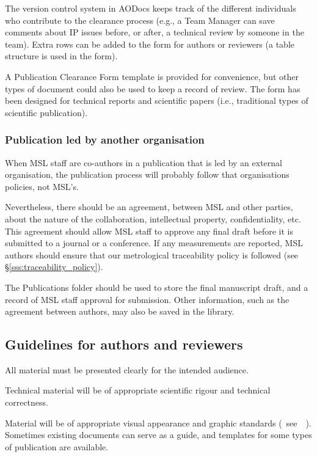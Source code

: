 The version control system in AODocs keeps track of the different individuals who contribute to the clearance process (e.g., a Team Manager can save comments about IP issues before, or after, a technical review by someone in the team). Extra rows can be added to the form for authors or reviewers (a table structure is used in the form).

A Publication Clearance Form template is provided for convenience, but other types of document could also be used to keep a record of review. The form has been designed for technical reports and scientific papers (i.e., traditional types of scientific publication).  

\subsubsection{Publication led by another organisation}

When MSL staff are co-authors in a publication that is led by an external organisation, the publication process will probably follow that organisations policies, not MSL's. 

Nevertheless, there should be an agreement, between MSL and other parties, about the nature of the collaboration, intellectual property, confidentiality, etc. This agreement should allow MSL staff to approve any final draft before it is submitted to a journal or a conference. If any measurements are reported, MSL authors should ensure that our metrological traceability policy is followed (see \S\ref{sss:traceability_policy}).

The Publications folder should be used to store the final manuscript draft, and a record of MSL staff approval for submission. Other information, such as the agreement between authors, may also be saved in the library. 

\subsection{Guidelines for authors and reviewers}
All material must be presented clearly for the intended audience.

Technical material will be of appropriate scientific rigour and technical correctness. 

Material will be of appropriate visual appearance and graphic standards (~see~\cite[\S\ref*{GRP-s:scientific_documents}]{MSL_Reporting_Guidelines}~). Sometimes existing documents can serve as a guide, and templates for some types of publication are available.  

